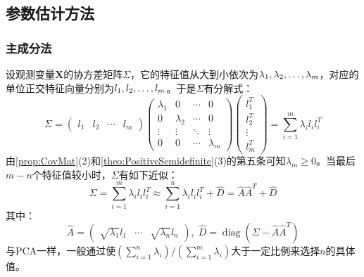 \subsection{参数估计方法}
\subsubsection{主成分法}
\begin{method}
	设观测变量$\mathbf{X}$的协方差矩阵$\Sigma$，它的特征值从大到小依次为$\lambda_1, \lambda_2, \dots, \lambda_{m}$，对应的单位正交特征向量分别为$l_1, l_2, \dots, l_{m}$。于是$\Sigma$有分解式：
	\begin{equation*}
		\Sigma=
		\begin{pmatrix}
			l_1 & l_2 & \cdots &l_m
		\end{pmatrix}
		\begin{pmatrix}
			\lambda_1 & 0 & \cdots & 0 \\
			0 & \lambda_2 & \cdots & 0 \\
			\vdots & \vdots & \ddots & \vdots \\
			0 & 0 & \cdots & \lambda_m
		\end{pmatrix}
		\begin{pmatrix}
			l_1^T \\
			l_2^T \\
			\vdots \\
			l_m^T
		\end{pmatrix}
		=\sum_{i=1}^{m}\lambda_il_il_i^T
	\end{equation*}
	由\cref{prop:CovMat}(2)和\cref{theo:PositiveSemidefinite}(3)的第五条可知$\lambda_m\geqslant0$。当最后$m-n$个特征值较小时，$\Sigma$有如下近似：
	\begin{equation*}
		\Sigma=\sum_{i=1}^{m}\lambda_il_il_i^T\approx\sum_{i=1}^{n}\lambda_il_il_i^T+\hat{D}=\hat{A}\hat{A}^T+\hat{D}
	\end{equation*}
	其中：
	\begin{equation*}
		\hat{A}=
		\begin{pmatrix}
			\sqrt{\lambda_1}l_1 & \cdots & \sqrt{\lambda_n}l_n
		\end{pmatrix},\;
		\hat{D}=\operatorname{diag}(\Sigma-\hat{A}\hat{A}^T)
	\end{equation*}
	与PCA一样，一般通过使$\left(\sum\limits_{i=1}^{n}\lambda_i\right)/\left(\sum\limits_{i=1}^{m}\lambda_i\right)$大于一定比例来选择$n$的具体值。
\end{method}
